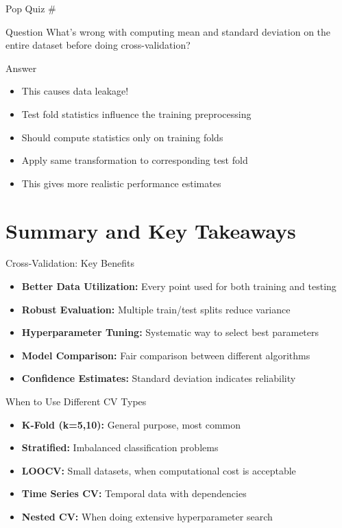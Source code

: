 \documentclass[usenames,dvipsnames]{beamer}
\newcounter{popquiz}
\begin{document}
\begin{frame}{Pop Quiz \#\thepopquiz}
\begin{block}{Question}
What's wrong with computing mean and standard deviation on the entire dataset before doing cross-validation?
\end{block}
\pause
\begin{block}{Answer}
\begin{itemize}
	\item This causes data leakage!
	\item Test fold statistics influence the training preprocessing
	\item Should compute statistics only on training folds
	\item Apply same transformation to corresponding test fold
	\item This gives more realistic performance estimates
\end{itemize}
\end{block}
\end{frame}

\section{Summary and Key Takeaways}

\begin{frame}{Cross-Validation: Key Benefits}
\begin{itemize}
	\item \pause \textbf{Better Data Utilization:} Every point used for both training and testing
	\item \pause \textbf{Robust Evaluation:} Multiple train/test splits reduce variance
	\item \pause \textbf{Hyperparameter Tuning:} Systematic way to select best parameters
	\item \pause \textbf{Model Comparison:} Fair comparison between different algorithms
	\item \pause \textbf{Confidence Estimates:} Standard deviation indicates reliability
\end{itemize}
\end{frame}

\begin{frame}{When to Use Different CV Types}
\begin{itemize}
	\item \pause \textbf{K-Fold (k=5,10):} General purpose, most common
	\item \pause \textbf{Stratified:} Imbalanced classification problems
	\item \pause \textbf{LOOCV:} Small datasets, when computational cost is acceptable
	\item \pause \textbf{Time Series CV:} Temporal data with dependencies
	\item \pause \textbf{Nested CV:} When doing extensive hyperparameter search
\end{itemize}
\end{frame}
\end{document}
